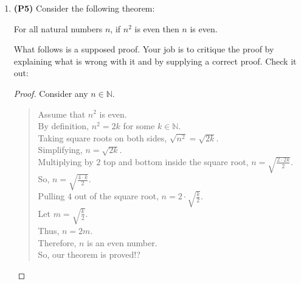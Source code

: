 \documentclass[12pt]{article}
\begin{document}
\begin{enumerate}
\item 
\textbf{(P5)}
Consider the following theorem: 

\begin{center} For all natural numbers $n$, if $n^{2}$ is even then $n$ is even. 
\end{center}

What follows is a supposed proof. Your job is to critique the proof by explaining what is wrong with it and by supplying a correct proof. Check it out:

    \begin{proof} Consider any $n \in \mathbb{N}$. 
    \begin{quote} 
    Assume that $n^{2}$ is even. \\  
    By definition, $n^{2} = 2k$ for some $k \in \mathbb{N}$.  \\
    Taking square roots on both sides,  $\sqrt{n^{2}}=\sqrt{2k}$. \\   
    Simplifying, $n=\sqrt{2k}$.   \\ 
    Multiplying by $2$ top and bottom inside the square root, $n=\sqrt{\frac{2\cdot 2k}{2}}$.   \\
    So, $n=\sqrt{\frac{4\cdot k}{2}}$. \\   
    Pulling $4$ out of the square root, $n=2\cdot\sqrt{\frac{k}{2}}$.  \\
    Let $m=\sqrt{\frac{k}{2}}$. \\ 
    Thus, $n=2m$.  \\
    Therefore, $n$ is an even number.  \\
    So, our theorem is proved!?
    \end{quote}
    \end{proof}
\end{enumerate}
\end{document}
